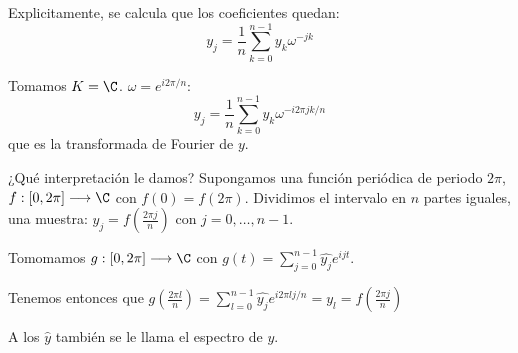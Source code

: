 Explicitamente, se calcula que los coeficientes quedan:
\[
  y_j=\frac{1}{n}\sum_{k=0}^{n-1}y_k\omega^{-jk}
\]

Tomamos \(K=\C\). \(\omega = e^{i2\pi/n}\):
\[
  y_j=\frac{1}{n}\sum_{k=0}^{n-1}y_k\omega^{-i2\pi jk/n}
\]
que es la transformada de Fourier de \(y\).

¿Qué interpretación le damos? Supongamos una función periódica de periodo
\(2\pi\), \(f:[0,2\pi]\longrightarrow\C\) con \(f(0)=f(2\pi)\).
Dividimos el intervalo en \(n\) partes iguales, una muestra:
\(y_j=f(\frac{2\pi j}{n})\) con \(j=0,\ldots,n-1\).

Tomomamos \(g:[0,2\pi]\longrightarrow\C\) con
\(g(t)=\sum_{j=0}^{n-1}\hat{y_j}e^{ijt}\).

Tenemos entonces que \(g(\frac{2\pi l}{n})=
\sum_{l=0}^{n-1}\hat{y_j}e^{i2\pi lj/n} = y_l=f(\frac{2\pi j}{n})\)

A los \(\hat{y}\) también se le llama el espectro de \(y\).
